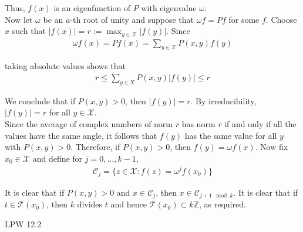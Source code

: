 \documentclass[12pt]{article}
\newenvironment{problem}[2][Problem]{\begin{trivlist}
\item[\hskip \labelsep {\bfseries #1}\hskip \labelsep {\bfseries #2.}]}{\end{trivlist}}
\begin{document}
\begin{enumerate}[\alph*)]
Thus, $f(x)$ is an eigenfunction of $P$ with eigenvalue $\omega$.\\

Now let $\omega$ be an $a$-th root of unity and suppose that $\omega f = Pf$ for some $f$. Choose $x$ such that $|f(x)| = r := \max_{y \in \mathcal{X}} |f(y)|$. Since
\begin{align*}
\omega f(x) = Pf(x) = \sum_{y \in \mathcal{X}} P(x,y)f(y)
\end{align*}

taking absolute values shows that 
\begin{align*}
r \leq \sum_{y \in X} P(x,y) |f(y)| \leq r
\end{align*}

We conclude that if $P(x, y) > 0$, then $|f(y)| = r$. By irreducibility, $|f(y)| = r$ for all $y \in \mathcal{X}$.\\

Since the average of complex numbers of norm $r$ has norm $r$ if and only if all the values have the same angle, it follows that $f(y)$ has the same value for all $y$ with $P(x,y) > 0$. Therefore, if $P(x,y) > 0$, then $f(y) = \omega f(x)$. Now fix $x_0 \in \mathcal{X}$ and define for $j = 0, \ldots, k-1$,
\begin{align*}
\mathcal{C}_j = \{z \in \mathcal{X}: f(z) = \omega^j f(x_0)\}
\end{align*}

It is clear that if $P(x,y)>0$ and $x \in \mathcal{C}_j$, then $x \in \mathcal{C}_{j + 1 \mod k}$. It is clear that if $t \in \mathcal{T}(x_0)$, then $k$ divides $t$ and hence $\mathcal{T}(x_0) \subset k\mathbb{Z}$, as required.

\end{enumerate}

\begin{problem}{III}
LPW 12.2
\end{problem}
\end{document}
